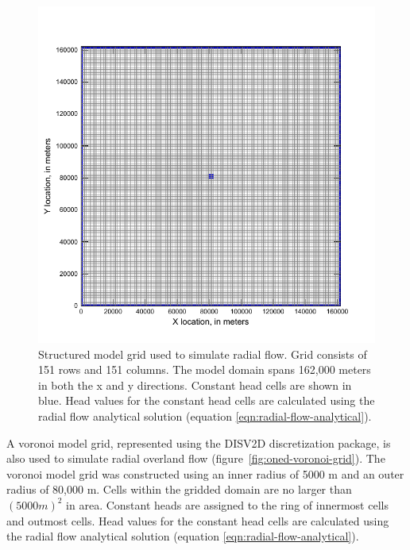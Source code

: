 \documentclass[fleqn]{article}
\begin{document}
\begin{figure}[h!tbp]
	\centering
	\includegraphics[scale=0.70]{figures/oned-structured-grid.pdf}
	\caption[Structured model grid used to simulate radial flow.]{Structured model grid used to simulate radial flow.  Grid consists of 151 rows and 151 columns.  The model domain spans 162,000 meters in both the x and y directions.  Constant head cells are shown in blue.  Head values for the constant head cells are calculated using the radial flow analytical solution (equation \ref{eqn:radial-flow-analytical}).}
	\label{fig:oned-structured-grid}
\end{figure}

A voronoi model grid, represented using the DISV2D discretization package, is also used to simulate radial overland flow (figure~\ref{fig:oned-voronoi-grid}).  The voronoi model grid was constructed using an inner radius of 5000 m and an outer radius of 80,000 m.  Cells within the gridded domain are no larger than $(5000 m)^2$ in area.  Constant heads are assigned to the ring of innermost cells and outmost cells.  Head values for the constant head cells are calculated using the radial flow analytical solution (equation \ref{eqn:radial-flow-analytical}).
\end{document}
